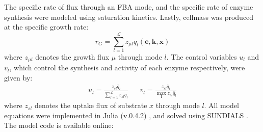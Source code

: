 \documentclass[10pt,twocolumn,twoside,final]{IEEEtran}
\begin{document}
The specific rate of flux through an FBA mode, and the specific rate of enzyme synthesis were modeled using saturation kinetics.
Lastly, cellmass was produced at the specific growth rate:
\begin{equation}
	r_{G}  = \sum_{l = 1}^{\mathcal{L}}z_{\mu l}q_{l}\left(\mathbf{e},\mathbf{k},\mathbf{x}\right)
\end{equation}
where $z_{\mu l}$ denotes the growth flux $\mu$ through mode $l$.
The control variables $u_{l}$ and $v_{l}$, which control the synthesis and activity of each enzyme respectively, were given by:
\begin{align*}
	u_{l}  = \frac{z_{sl}\bar{q}_{l}}{\sum\limits_{l = 1}^{\mathcal{L}}z_{sl}\bar{q}_{l}} && v_{l} = \frac{z_{sl}\bar{q}_{l}}{\max\limits_{\mathbf{l}} z_{sl}\bar{q}_{l}}
\end{align*}
where $z_{sl}$ denotes the uptake flux of substrate $x$ through mode $l$.
All model equations were implemented in Julia (v.0.4.2) \cite{Julia}, and solved using SUNDIALS \cite{Sundials}. The model code is available online:


\end{document}
